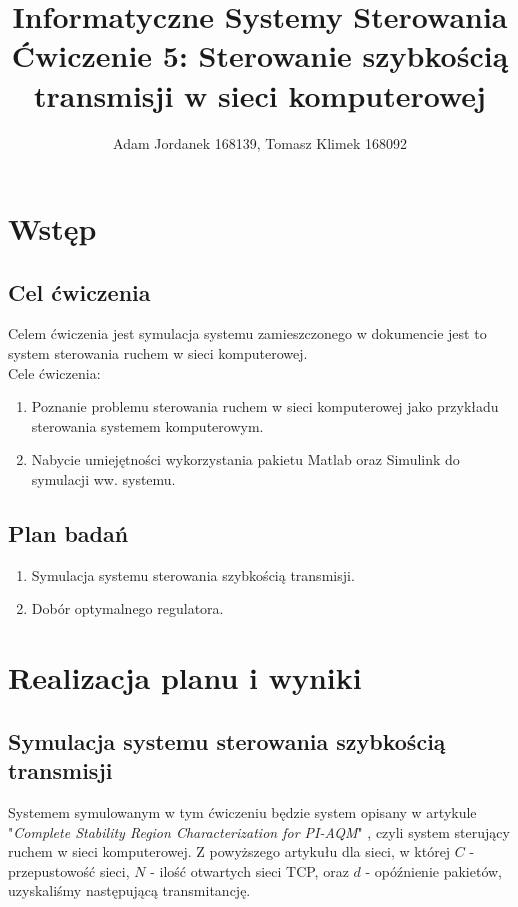 \documentclass[a4paper,10pt]{article}
\title{Informatyczne Systemy Sterowania \\ \large Ćwiczenie 5: Sterowanie szybkością transmisji w sieci komputerowej}
\author{Adam Jordanek 168139, Tomasz Klimek 168092}
\begin{document}
\maketitle
\section{Wstęp}\label{sec:wstęp}
\subsection{Cel ćwiczenia}
Celem ćwiczenia jest symulacja systemu zamieszczonego w dokumencie jest to system sterowania ruchem w sieci komputerowej. \\
Cele ćwiczenia: 
\begin{enumerate}
	\item Poznanie problemu sterowania ruchem w sieci komputerowej jako przykładu 
sterowania systemem komputerowym. 
	\item Nabycie umiejętności wykorzystania pakietu Matlab oraz Simulink do symulacji ww. systemu. 
\end{enumerate}
\subsection{Plan badań} 
\begin{enumerate}
	\item Symulacja systemu sterowania szybkością transmisji.
	\item Dobór optymalnego regulatora.
\end{enumerate}
\section{Realizacja planu i wyniki}

\subsection{Symulacja systemu sterowania szybkością transmisji}

Systemem symulowanym w tym ćwiczeniu będzie system opisany w artykule "\textit{Complete Stability Region
Characterization for PI-AQM}" , czyli system sterujący ruchem w sieci komputerowej. Z powyższego artykułu dla sieci, w której $C$ - przepustowość sieci, $N$ - ilość otwartych sieci TCP, oraz $d$ - opóźnienie pakietów, uzyskaliśmy następującą transmitancję.
\end{document}

